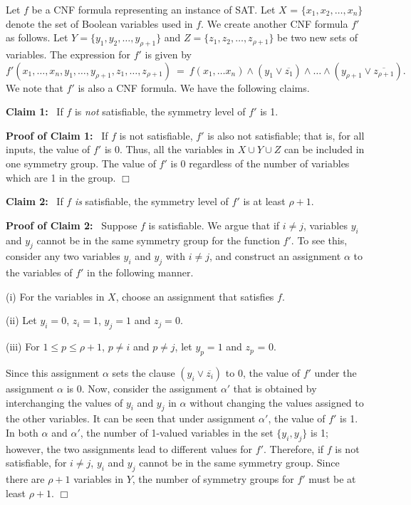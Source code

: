 Let $f$ be a CNF formula representing an instance of SAT.
Let $X$ = $\{x_1, x_2, \ldots, x_n\}$ denote the set of
Boolean variables used in $f$.
We create another CNF formula $f'$ as follows.
Let $Y = \{y_1, y_2, \ldots, y_{\rho+1}\}$ and
$Z = \{z_1, z_2, \ldots, z_{\rho+1}\}$ be two new sets of variables.
The expression for $f'$ is given by
\[
f'(x_1, \ldots, x_n, y_1, \ldots, y_{\rho+1},
z_1, \ldots, z_{\rho+1}) ~=~ 
    f(x_1, \ldots x_n) \wedge (y_1 \vee \overline{z_1}) \wedge \ldots \wedge
                              (y_{\rho+1} \vee \overline{z_{\rho+1}}).
\]
We note that $f'$ is also a CNF formula.
We have the following claims.

\medskip

\noindent
\textbf{Claim 1:}~ If $f$ is \emph{not} satisfiable, 
the symmetry level of $f'$ is 1.

\smallskip

\noindent
\textbf{Proof of Claim 1:}~ If $f$ is not satisfiable, $f'$ is also
not satisfiable; that is, for all inputs, the value of $f'$ is 0.
Thus, all the variables in $X \cup Y \cup Z$ can be included in one
symmetry group.
The value of $f'$ is 0 regardless of the number of variables 
which are 1 in the group. 
\hfill$\Box$

\medskip

\noindent
\textbf{Claim 2:}~ If $f$ \emph{is} satisfiable, 
the symmetry level of $f'$ is at least $\rho+1$.

\smallskip

\noindent
\textbf{Proof of Claim 2:}~ Suppose $f$ is satisfiable.
We argue that if $i \neq j$, variables $y_i$ and $y_j$
cannot be in the same symmetry group for the function $f'$.
To see this, consider any two variables $y_i$ and $y_j$ with $i \neq j$,
and construct an assignment $\alpha$ to
the variables of $f'$ in the following manner.
\begin{description}
\item{(i)} For the variables in $X$, choose an assignment that
satisfies $f$.
\item{(ii)} Let $y_i = 0$, $z_i = 1$, $y_j = 1$ and $z_j = 0$.
\item{(iii)} For $1 \leq p \leq \rho+1$, $p \neq i$ and $p \neq j$,
let $y_p = 1$ and $z_p$ = 0.
\end{description}
Since this assignment $\alpha$ sets the clause $(y_i \vee \overline{z_i})$ to 0,
the value of $f'$ under the assignment $\alpha$ is 0.
Now, consider the assignment $\alpha'$ that is obtained by interchanging
the values of $y_i$ and $y_j$ in $\alpha$ without changing the
values assigned to the other variables. 
It can be seen that under assignment $\alpha'$, the value of $f'$ is 1.
In both $\alpha$ and $\alpha'$, the number of 1-valued variables in 
the set $\{y_i, y_j\}$ is 1; however, the two assignments lead to 
different values for $f'$.
Therefore, if $f$ is not satisfiable, for $i \neq j$, $y_i$ and $y_j$ cannot
be in the same symmetry group.
Since there are $\rho+1$ variables in $Y$, the number of symmetry groups 
for $f'$ must be at least $\rho+1$. \hfill$\Box$

